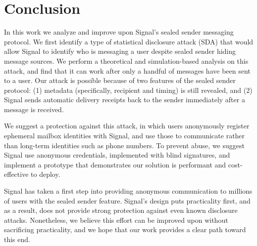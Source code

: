 \section{Conclusion}


In this work we analyze and improve upon Signal's sealed sender messaging protocol.
We first identify a type of statistical disclosure attack (SDA) that would allow
Signal to identify who is messaging a user despite sealed sender hiding message
sources. We perform a theoretical and simulation-based analysis on this attack,
and find that it can work after only a handful of messages have been sent to a
user. Our attack is possible because of two features of the sealed sender
protocol: (1) metadata (specifically, recipient and timing) is still revealed,
and (2) Signal sends automatic delivery receipts back to the sender immediately
after a message is received.

We suggest a protection against this attack, in which users anonymously register
ephemeral mailbox identities with Signal, and use those to communicate rather
than long-term identities such as phone numbers. To prevent abuse, we suggest
Signal use anonymous credentials, implemented with blind signatures, and
implement a prototype that demonstrates our solution is performant and cost-effective
to deploy.

Signal has taken a first step into providing anonymous communication to
millions of users with the sealed sender feature. Signal's design
puts practicality first, and as a result, does not provide strong protection
against even known disclosure attacks. Nonetheless, we believe this effort can
be improved upon without sacrificing practicality, and we hope that our work
provides a clear path toward this end.


